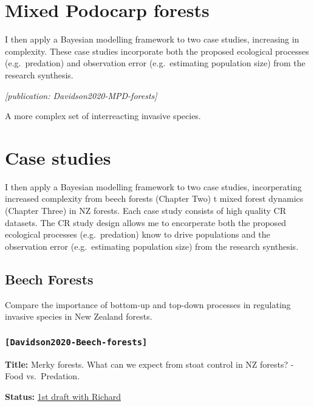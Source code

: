 \hypertarget{app-mpd}{%
\chapter{Mixed Podocarp forests}\label{app-mpd}}

I then apply a Bayesian modelling framework to two case studies, increasing in complexity. These case studies incorporate both the proposed ecological processes (e.g.~predation) and observation error (e.g.~estimating population size) from the research synthesis.

\emph{{[}publication: Davidson2020-MPD-forests{]}}

A more complex set of interreacting invasive species.

\hypertarget{case-studies-1}{%
\chapter{Case studies}\label{case-studies-1}}

I then apply a Bayesian modelling framework to two case studies, incorperating increased complexity from beech forests (Chapter Two) t mixed forest dynamics (Chapter Three) in NZ forests. Each case study consists of high quality CR datasets. The CR study design allows me to encorperate both the proposed ecological processes (e.g.~predation) know to drive populations and the observation error (e.g.~estimating population size) from the research synthesis.

\hypertarget{beech}{%
\section{Beech Forests}\label{beech}}

Compare the importance of bottom-up and top-down processes in regulating invasive species in New Zealand forests.

\hypertarget{davidson2020-beech-forests}{%
\subsection{\texorpdfstring{\texttt{{[}Davidson2020-Beech-forests{]}}}{{[}Davidson2020-Beech-forests{]}}}\label{davidson2020-beech-forests}}

\textbf{Title:} Merky forests. What can we expect from stoat control in NZ forests? - Food vs.~Predation.

\textbf{Status:} \href{https://www.dropbox.com/s/m5hte0n2vyl1dt2/Davidson_2019_BeechForest_19022019.docx?dl=0}{1st draft with Richard}

